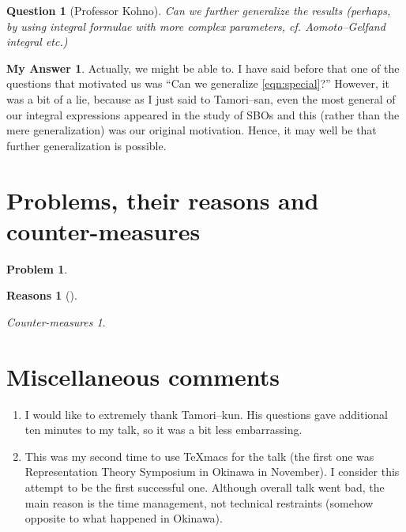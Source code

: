 \documentclass[12pt]{article} %
\theoremstyle{theorem}
\newtheorem{problem}{Problem}
\newtheorem{question}{Question}
\theoremstyle{definition}
\newtheorem{answer}{My Answer}
\newtheorem{reason}{Reasons}
\theoremstyle{remark}
\newtheorem{countermeasure}{Counter-measures}
\begin{document}
\begin{question}[Professor Kohno]
    Can we further generalize the results (perhaps, by using integral formulae with more complex
    parameters, cf. Aomoto--Gelfand integral etc.)
\end{question}
\begin{answer}
    Actually, we might be able to. I have said before that one of the questions that
    motivated us was ``Can we generalize \eqref{eqn:special}?'' However, it was a bit of a lie,
    because as I just said to Tamori--san, even the most general of our integral expressions appeared
    in the study of SBOs and this (rather than the mere generalization) was our original motivation.
    Hence, it may well be that further generalization is possible.
\end{answer}
\section{Problems, their reasons and counter-measures}
\begin{problem}
\end{problem}
\begin{reason}[]
\end{reason}
\begin{countermeasure}
\end{countermeasure}
\section{Miscellaneous comments}
\begin{enumerate}
    \item I would like to extremely thank Tamori--kun. His questions gave additional ten minutes to
        my talk, so it was a bit less embarrassing.
    \item This was my second time to use TeXmacs for the talk (the first one was Representation Theory
        Symposium in Okinawa in November). I consider this attempt to be the first successful one.
        Although overall talk went bad, the main reason is the time management, not technical restraints
        (somehow opposite to what happened in Okinawa).
\end{enumerate}
\end{document}
